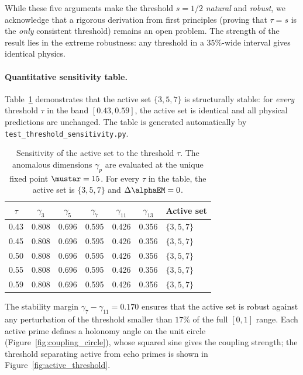 \documentclass[12pt,a4paper]{article}
\begin{document}
\begin{remark}
\noindent
While these five arguments make the threshold $s = 1/2$ \emph{natural}
and \emph{robust}, we acknowledge that a rigorous derivation
from first principles (proving that $\tau = s$ is the \emph{only}
consistent threshold) remains an open problem.
The strength of the result lies in the extreme robustness:
any threshold in a $35\%$-wide interval gives identical physics.
\end{remark}

\paragraph{Quantitative sensitivity table.}
Table~\ref{tab:threshold_sensitivity} demonstrates that the active set
$\{3,5,7\}$ is structurally stable: for \emph{every} threshold $\tau$
in the band $[0.43, 0.59]$, the active set is identical and all
physical predictions are unchanged.  The table is generated
automatically by \texttt{test\_threshold\_sensitivity.py}.

\begin{table}[htbp]
\centering
\caption{Sensitivity of the active set to the threshold $\tau$.
  The anomalous dimensions $\gamma_p$ are evaluated at the unique
  fixed point $\mustar = 15$.  For every $\tau$ in the table,
  the active set is $\{3,5,7\}$ and $\Delta\alphaEM = 0$.}
\label{tab:threshold_sensitivity}
\begin{tabular}{ccccccl}
\toprule
$\tau$ & $\gamma_3$ & $\gamma_5$ & $\gamma_7$ & $\gamma_{11}$
  & $\gamma_{13}$ & Active set \\
\midrule
0.43 & 0.808 & 0.696 & 0.595 & 0.426 & 0.356 & $\{3,5,7\}$ \\
0.45 & 0.808 & 0.696 & 0.595 & 0.426 & 0.356 & $\{3,5,7\}$ \\
0.50 & 0.808 & 0.696 & 0.595 & 0.426 & 0.356 & $\{3,5,7\}$ \\
0.55 & 0.808 & 0.696 & 0.595 & 0.426 & 0.356 & $\{3,5,7\}$ \\
0.59 & 0.808 & 0.696 & 0.595 & 0.426 & 0.356 & $\{3,5,7\}$ \\
\bottomrule
\end{tabular}
\end{table}

\noindent
The stability margin $\gamma_7 - \gamma_{11} = 0.170$ ensures that the
active set is robust against any perturbation of the threshold smaller
than $17\%$ of the full $[0,1]$ range.
Each active prime defines a holonomy angle on the unit circle
(Figure~\ref{fig:coupling_circle}), whose squared sine gives the
coupling strength; the threshold separating active from echo primes
is shown in Figure~\ref{fig:active_threshold}.
\end{document}
